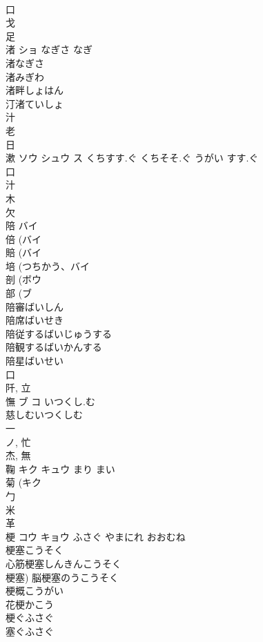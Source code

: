 \documentclass[8pt]{extreport}
\begin{document}
\begin{CJK}{UTF8}{min}
\\	口 
\\	戈 
\\	足 
\\	渚	ショ	なぎさ なぎ	
\\	渚なぎさ 
\\	渚みぎわ 
\\	渚畔しょはん 
\\	汀渚ていしょ 
\\	汁 
\\	老 
\\	日 
\\	漱	ソウ シュウ ス	くちすす.ぐ くちそそ.ぐ うがい すす.ぐ	
\\	口 
\\	汁 
\\	木 
\\	欠 
\\	陪	バイ		
\\	倍 (バイ 
\\	賠 (バイ 
\\	培 (つちかう、バイ 
\\	剖 (ボウ 
\\	部 (ブ 
\\	陪審ばいしん
\\	陪席ばいせき
\\	陪従するばいじゅうする
\\	陪観するばいかんする
\\	陪星ばいせい
\\	口 
\\	阡, 立 
\\	憮	ブ コ	いつくし.む	
\\	慈しむいつくしむ
\\	一 
\\	ノ, 忙 
\\	杰, 無 
\\	鞠	キク キュウ	まり まい	
\\	菊 (キク 
\\	勹 
\\	米 
\\	革 
\\	梗	コウ キョウ	ふさぐ やまにれ おおむね	
\\	梗塞こうそく 
\\	心筋梗塞しんきんこうそく 
\\	梗塞) 脳梗塞のうこうそく 
\\	梗概こうがい 
\\	花梗かこう 
\\	梗ぐふさぐ 
\\	塞ぐふさぐ 

\end{CJK}
\end{document}
